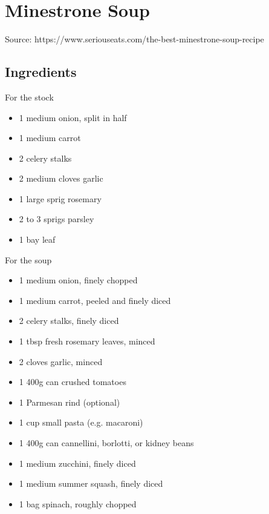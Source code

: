 \clearpage
\section{Minestrone Soup}


Source: https://www.seriouseats.com/the-best-minestrone-soup-recipe

\subsection{Ingredients}

\begin{multicols}{2}
    For the stock

    \begin{itemize}
        \item 1 medium onion, split in half
        \item 1 medium carrot
        \item 2 celery stalks
        \item 2 medium cloves garlic
        \item 1 large sprig rosemary
        \item 2 to 3 sprigs parsley
        \item 1 bay leaf
    \end{itemize}

    \vfill\null
    \columnbreak

    For the soup

    \begin{itemize}
        \item 1 medium onion, finely chopped
        \item 1 medium carrot, peeled and finely diced
        \item 2 celery stalks, finely diced
        \item 1 tbsp fresh rosemary leaves, minced
        \item 2 cloves garlic, minced
        \item 1 400g can crushed tomatoes
        \item 1 Parmesan rind (optional)
        \item 1 cup small pasta (e.g. macaroni)
        \item 1 400g can cannellini, borlotti, or kidney beans
        \item 1 medium zucchini, finely diced
        \item 1 medium summer squash, finely diced
        \item 1 bag spinach, roughly chopped
    \end{itemize}
\end{multicols}

